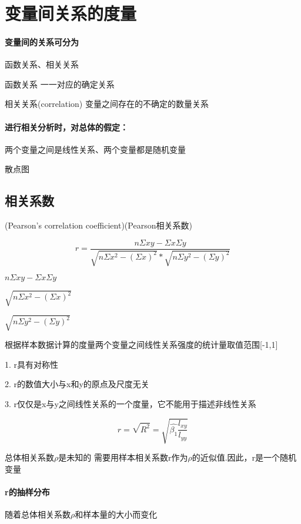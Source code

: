 \documentclass[UTF8,10pt]{book}
\begin{document}
\section{变量间关系的度量}

\paragraph{变量间的关系可分为}	函数关系、相关关系

函数关系	一一对应的确定关系

相关关系(correlation)	变量之间存在的不确定的数量关系

\paragraph{进行相关分析时，对总体的假定：}	
两个变量之间是线性关系、两个变量都是随机变量

散点图	

\subsection{相关系数}
    (Pearson's correlation coefficient)(Pearson相关系数)	

    $$ r = \frac{n \Sigma xy -\Sigma x \Sigma y }{\sqrt{n \Sigma x^2 - \left( \Sigma x \right)^2} * \sqrt{n \Sigma y^2 - \left( \Sigma y \right)^2} } $$ 

    $ n \Sigma xy -\Sigma x \Sigma y $ 

    $ \sqrt{n \Sigma x^2 - \left( \Sigma x \right)^2} $ 

    $ \sqrt{n \Sigma y^2 - \left( \Sigma y \right)^2} $ 

    根据样本数据计算的度量两个变量之间线性关系强度的统计量取值范围[-1,1]

    1. r具有对称性

    2. r的数值大小与x和y的原点及尺度无关

    3. r仅仅是x与y之间线性关系的一个度量，它不能用于描述非线性关系 

    $$ r = \sqrt{R^2}=\sqrt{\hat{\beta_1} \frac{l_{xy}}{l_{yy}}} $$

    总体相关系数$\rho$是未知的 需要用样本相关系数r作为$\rho$的近似值.因此，r是一个随机变量

\paragraph{r的抽样分布} 随着总体相关系数$\rho$和样本量的大小而变化	
\end{document}
